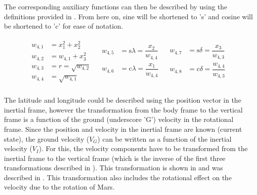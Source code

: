 \noindent
The corresponding auxiliary functions can then be described by  using the definitions provided in . From here on, sine will be shortened to 's' and cosine will be shortened to 'c' for ease of notation.

\begin{align} \label{eq:auxFtransAngl}
\begin{split}
w_{4,1} &= x_{1}^{2}+x_{2}^{2} \\
w_{4,2} &= w_{4,1}+x_{3}^{2} \\
w_{4,3} &= r = \sqrt{w_{4,2}} \\
w_{4,4} &= \sqrt{w_{4,1}} \\
\end{split}
&
\begin{split}
w_{4,5} &= \text{s}\lambda = \dfrac{x_{2}}{w_{4,4}}\\
w_{4,6} &= \text{c}\lambda = \dfrac{x_{1}}{w_{4,4}} \\
\end{split}
&
\begin{split}
w_{4,7} &= \text{s}\delta = \dfrac{x_{3}}{w_{4,3}} \\
w_{4,8} &= \text{c}\delta = \dfrac{w_{4,4}}{w_{4,3}}\\
\end{split} 
\end{align} 

\noindent
The latitude and longitude could be described using the position vector in the inertial frame, however the transformation from the body frame to the vertical frame is a function of the ground (underscore 'G') velocity in the rotational frame. Since the position and velocity in the inertial frame are known (current state), the ground velocity ($V_{G}$) can be written as a function of the inertial velocity ($V_{I}$). For this, the velocity components have to be transformed from the inertial frame to the vertical frame (which is the inverse of the first three transformations described in ). This transformation is shown in  and was described in \cite{mooij1994motion}. This transformation also includes the rotational effect on the velocity due to the rotation of Mars.
 
